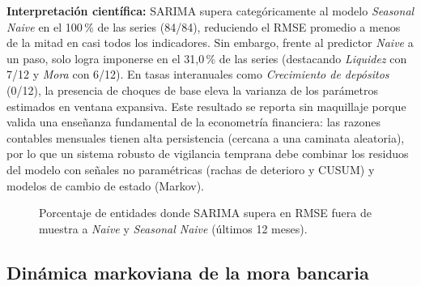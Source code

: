 \documentclass[11pt,letterpaper]{article}
\begin{document}
\textbf{Interpretación científica:} SARIMA supera categóricamente al modelo \emph{Seasonal Naive} en el 100\,\% de las series (84/84), reduciendo el RMSE promedio a menos de la mitad en casi todos los indicadores. Sin embargo, frente al predictor \emph{Naive} a un paso, solo logra imponerse en el 31{,}0\,\% de las series (destacando \emph{Liquidez} con 7/12 y \emph{Mora} con 6/12). En tasas interanuales como \emph{Crecimiento de depósitos} (0/12), la presencia de choques de base eleva la varianza de los parámetros estimados en ventana expansiva. Este resultado se reporta sin maquillaje porque valida una enseñanza fundamental de la econometría financiera: las razones contables mensuales tienen alta persistencia (cercana a una caminata aleatoria), por lo que un sistema robusto de vigilancia temprana debe combinar los residuos del modelo con señales no paramétricas (rachas de deterioro y CUSUM) y modelos de cambio de estado (Markov).

\begin{figure}[H]
\centering
{}
\caption{Porcentaje de entidades donde SARIMA supera en RMSE fuera de muestra a \emph{Naive} y \emph{Seasonal Naive} (últimos 12 meses).}
\label{fig:backtest_rmse}
\end{figure}

\subsection{Dinámica markoviana de la mora bancaria}
\end{document}
